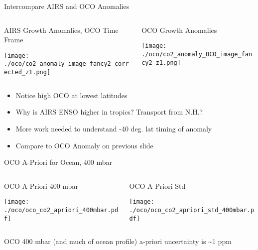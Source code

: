 \documentclass[10pt,t]{beamer}
\begin{document}
\begin{frame}[label={sec:orgc43ac05}]{Intercompare AIRS and OCO Anomalies}
\vspace{-0.1in}

\begin{columns}
\begin{column}{0.55\columnwidth}
\begin{block}{\footnotesize AIRS Growth Anomalies, OCO Time Frame}
\begin{center}
\texttt{[image: ./oco/co2\_anomaly\_image\_fancy2\_corrected\_z1.png]}
\end{center}
\end{block}
\end{column}

\begin{column}{0.55\columnwidth}
\begin{block}{\footnotesize OCO Growth Anomalies}
\begin{center}
\texttt{[image: ./oco/co2\_anomaly\_OCO\_image\_fancy2\_z1.png]}
\end{center}
\end{block}
\end{column}
\end{columns}

\small 
\begin{itemize}
\item Notice high OCO at lowest latitudes
\item Why is AIRS ENSO higher in tropics?  Transport from N.H.?
\item More work needed to understand -40 deg. lat timing of \cd anomaly
\item Compare to OCO Anomaly on previous slide
\end{itemize}
\end{frame}


\begin{frame}[label={sec:orgec7a808}]{OCO A-Priori for Ocean, 400 mbar}
\begin{columns}
\begin{column}{0.55\columnwidth}
\begin{block}{OCO \cd A-Priori 400 mbar}
\begin{center}
\texttt{[image: ./oco/oco\_co2\_apriori\_400mbar.pdf]}
\end{center}
\end{block}
\end{column}

\begin{column}{0.55\columnwidth}
\begin{block}{OCO \cd A-Priori Std}
\begin{center}
\texttt{[image: ./oco/oco\_co2\_apriori\_std\_400mbar.pdf]}
\end{center}
\end{block}
\end{column}
\end{columns}

\small OCO 400 mbar (and much of ocean profile) a-priori uncertainty is \textasciitilde{}1 ppm
\end{frame}
\end{document}
